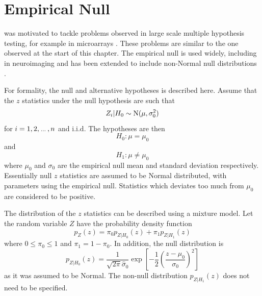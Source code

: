 \section{Empirical Null}

\cite{efron2004large} was motivated to tackle problems observed in large scale multiple hypothesis testing, for example in microarrays \citep{hedenfalk2001gene, efron2002empirical, efron2003robbins}. These problems are similar to the one observed at the start of this chapter. The empirical null is used widely, including in neuroimaging \citep{schwartzman2008false, schwartzman2009empirical} and has been extended to include non-Normal null distributions \citep{schwartzman2008false, schwartzman2008empirical}.

For formality, the null and alternative hypotheses is described here. Assume that the $z$ statistics under the null hypothesis are such that
\begin{equation}
  Z_i|H_0\sim\operatorname{N}(\mu,\sigma_0^2)
\end{equation}
for $i=1,2,\dotdotdot,n$ and i.i.d. The hypotheses are then
\begin{equation}
  H_0:\mu = \mu_0
\end{equation}
and
\begin{equation}
  H_1:\mu\neq\mu_0
\end{equation}
where $\mu_0$ and $\sigma_0$ are the empirical null mean and standard deviation respectively. Essentially null $z$ statistics are assumed to be Normal distributed, with parameters using the empirical null. Statistics which deviates too much from $\mu_0$ are considered to be positive.

The distribution of the $z$ statistics can be described using a mixture model. Let the random variable $Z$ have the probability density function
\begin{equation}
  p_Z(z) =
  \pi_0 p_{Z|H_0}(z) + \pi_1 p_{Z|H_1}(z)
\end{equation}
where $0\leqslant\pi_0\leqslant 1$ and  $\pi_1 = 1-\pi_0$. In addition, the null distribution is
\begin{equation}
  p_{Z|H_0}(z) = 
  \dfrac{1}{\sqrt{2\pi}\widehat{\sigma}_0}
  \exp\left[
    -\dfrac{1}{2}
    \left(
      \dfrac{z-{\mu}_0}{{\sigma}_0}
    \right)^2
  \right]
\end{equation}
as it was assumed to be Normal. The non-null distribution $p_{Z|H_1}(z)$ does not need to be specified.

